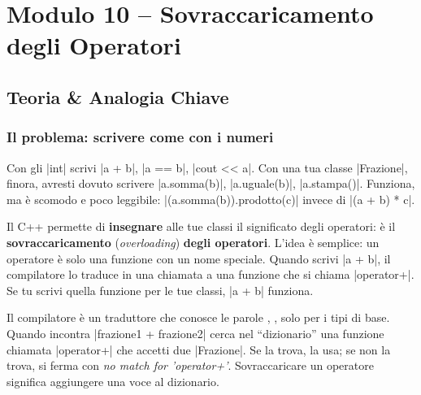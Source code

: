 \chapter{Modulo 10 -- Sovraccaricamento degli Operatori}

\section{Teoria \& Analogia Chiave}

\subsection*{Il problema: scrivere come con i numeri}

Con gli \cc|int| scrivi \cc|a + b|, \cc|a == b|, \cc|cout << a|. Con una tua classe
\cc|Frazione|, finora, avresti dovuto scrivere \cc|a.somma(b)|, \cc|a.uguale(b)|,
\cc|a.stampa()|. Funziona, ma è scomodo e poco leggibile: \cc|(a.somma(b)).prodotto(c)|
invece di \cc|(a + b) * c|.

Il C++ permette di \textbf{insegnare} alle tue classi il significato degli operatori:
è il \textbf{sovraccaricamento} (\emph{overloading}) \textbf{degli operatori}. L'idea
è semplice: un operatore è solo una funzione con un nome speciale. Quando scrivi
\cc|a + b|, il compilatore lo traduce in una chiamata a una funzione che si chiama
\cc|operator+|. Se tu scrivi quella funzione per le tue classi, \cc|a + b| funziona.

\begin{analogia}
Il compilatore è un traduttore che conosce le parole \q{+}, \q{==}, \q{<<} solo per
i tipi di base. Quando incontra \cc|frazione1 + frazione2| cerca nel ``dizionario''
una funzione chiamata \cc|operator+| che accetti due \cc|Frazione|. Se la trova, la
usa; se non la trova, si ferma con \emph{no match for 'operator+'}. Sovraccaricare un
operatore significa aggiungere una voce al dizionario.
\end{analogia}

